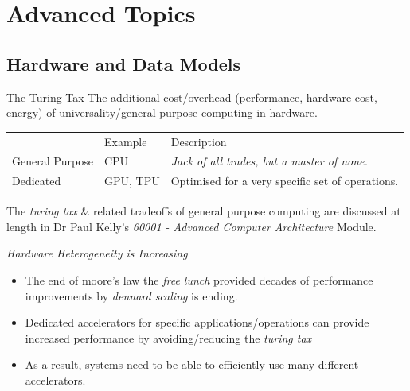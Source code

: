 \chapter{Advanced Topics}
\section{Hardware and Data Models}
\begin{sidenotebox}{The Turing Tax}
    The additional cost/overhead (performance, hardware cost, energy) of universality/general purpose computing in hardware.
    \begin{center}
        \begin{tabular}{l l p{}}
                            & Example  & Description                                        \\
            General Purpose & CPU      & \textit{Jack of all trades, but a master of none.} \\
            Dedicated       & GPU, TPU & Optimised for a very specific set of operations.   \\
        \end{tabular}
    \end{center}
    The  \textit{turing tax} \& related tradeoffs of general purpose computing are discussed at length in Dr Paul Kelly's \textit{60001 - Advanced Computer Architecture} Module.
\end{sidenotebox}
\noindent
\centerline{\textit{Hardware Heterogeneity is Increasing}}
\begin{itemize}
    \item The end of moore's law the \textit{free lunch} provided decades of performance improvements by \textit{dennard scaling} is ending.
    \item Dedicated accelerators for specific applications/operations can provide increased performance by avoiding/reducing the \textit{turing tax}
    \item As a result, systems need to be able to efficiently use many different accelerators.
\end{itemize}

